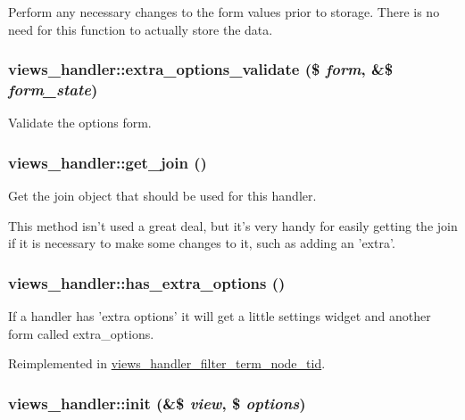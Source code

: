 Perform any necessary changes to the form values prior to storage. There is no need for this function to actually store the data. \hypertarget{classviews__handler_8a2c2fb295ec8024fc9e33361a92e8ac}{
\subsubsection[{extra\_\-options\_\-validate}]{\setlength{\rightskip}{0pt plus 5cm}views\_\-handler::extra\_\-options\_\-validate (\$ {\em form}, \/  \&\$ {\em form\_\-state})}}
\label{classviews__handler_8a2c2fb295ec8024fc9e33361a92e8ac}


Validate the options form. \hypertarget{classviews__handler_c05dca8ea852b137f7f288d090a49221}{
\subsubsection[{get\_\-join}]{\setlength{\rightskip}{0pt plus 5cm}views\_\-handler::get\_\-join ()}}
\label{classviews__handler_c05dca8ea852b137f7f288d090a49221}


Get the join object that should be used for this handler.

This method isn't used a great deal, but it's very handy for easily getting the join if it is necessary to make some changes to it, such as adding an 'extra'. \hypertarget{classviews__handler_10d35469346efc352d21e5f44de60b2e}{
\subsubsection[{has\_\-extra\_\-options}]{\setlength{\rightskip}{0pt plus 5cm}views\_\-handler::has\_\-extra\_\-options ()}}
\label{classviews__handler_10d35469346efc352d21e5f44de60b2e}


If a handler has 'extra options' it will get a little settings widget and another form called extra\_\-options. 

Reimplemented in \hyperlink{classviews__handler__filter__term__node__tid_72232eda675756741ce92061cb4685ee}{views\_\-handler\_\-filter\_\-term\_\-node\_\-tid}.\hypertarget{classviews__handler_1f5f42ba46d3584280788fda97eee8c5}{
\subsubsection[{init}]{\setlength{\rightskip}{0pt plus 5cm}views\_\-handler::init (\&\$ {\em view}, \/  \$ {\em options})}}
\label{classviews__handler_1f5f42ba46d3584280788fda97eee8c5}


